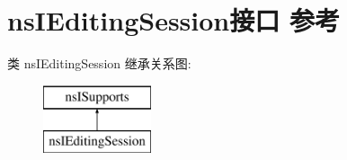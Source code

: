 \hypertarget{interfacens_i_editing_session}{}\section{ns\+I\+Editing\+Session接口 参考}
\label{interfacens_i_editing_session}
类 ns\+I\+Editing\+Session 继承关系图\+:\begin{figure}[H]
\begin{center}
\leavevmode
\includegraphics[height=2.000000cm]{interfacens_i_editing_session}
\end{center}
\end{figure}
